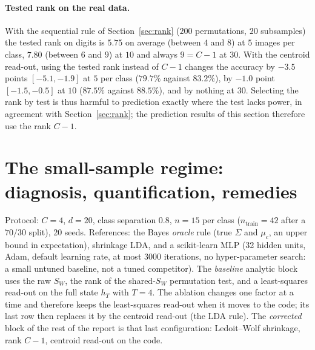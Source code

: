 \documentclass[11pt,a4paper]{article}
\theoremstyle{plain}
\theoremstyle{definition}
\theoremstyle{remark}
\begin{document}
\paragraph{Tested rank on the real data.} With the sequential rule of
Section~\ref{sec:rank} ($200$ permutations, $20$ subsamples) the tested
rank on digits is $5.75$ on average (between $4$ and $8$) at $5$ images per
class, $7.80$ (between $6$ and $9$) at $10$ and always $9=C-1$ at $30$. With
the centroid read-out, using the tested rank instead of $C-1$ changes the
accuracy by $-3.5$ points $[-5.1,-1.9]$ at $5$ per class ($79.7\%$ against
$83.2\%$), by $-1.0$ point $[-1.5,-0.5]$ at $10$ ($87.5\%$ against
$88.5\%$), and by nothing at $30$. Selecting the rank by test is thus
harmful to prediction exactly where the test lacks power, in agreement with
Section~\ref{sec:rank}; the prediction results of this section therefore
use the rank $C-1$.

\section{The small-sample regime: diagnosis, quantification, remedies}
\label{sec:small}
Protocol: $C=4$, $d=20$, class separation $0.8$, $n=15$ per class
($n_{\mathrm{train}}=42$ after a $70/30$ split), 20 seeds. References: the
Bayes \emph{oracle} rule (true $\Sigma$ and $\mu_c$, an upper bound in
expectation), shrinkage LDA, and a scikit-learn MLP (32 hidden units, Adam,
default learning rate, at most 3000 iterations, no hyper-parameter search:
a small untuned baseline, not a tuned competitor). The \emph{baseline}
analytic block uses the raw $S_W$, the rank of the shared-$S_W$
permutation test, and a least-squares read-out on the full state $h_T$ with
$T=4$. The ablation changes one factor at a time and therefore keeps the
least-squares read-out when it moves to the code; its last row then
replaces it by the centroid read-out (the LDA rule). The \emph{corrected}
block of the rest of the report is that last configuration: Ledoit--Wolf
shrinkage, rank $C-1$, centroid read-out on the code.
\end{document}
